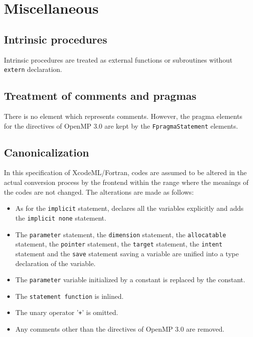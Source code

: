 \section{Miscellaneous}

\subsection{Intrinsic procedures}

Intrinsic procedures are treated as external functions or subroutines
without {\tt extern} declaration.


\subsection{Treatment of comments and pragmas}

There is no element which represents comments. However, the pragma elements for the directives
of OpenMP 3.0 are kept by the {\tt FpragmaStatement} elements.


\subsection{Canonicalization}

In this specification of XcodeML/Fortran, codes are assumed to be altered in the actual
conversion process by the frontend within the range where the meanings of the codes are not changed.
The alterations are made as follows:

\begin{itemize}
\item As for the {\tt implicit} statement, declares all the variables explicitly and adds the {\tt implicit none} statement.
\item The {\tt parameter} statement, the {\tt dimension} statement, the {\tt allocatable} statement,
the {\tt pointer} statement, the {\tt target} statement, the {\tt intent} statement and the {\tt save} statement
saving a variable are unified into a type declaration of the variable.
\item The {\tt parameter} variable initialized by a constant is replaced by the constant.
\item The {\tt statement function} is inlined.
\item The unary operator '{\tt +}' is omitted.
\item Any comments other than the directives of OpenMP 3.0 are removed.
\end{itemize}

